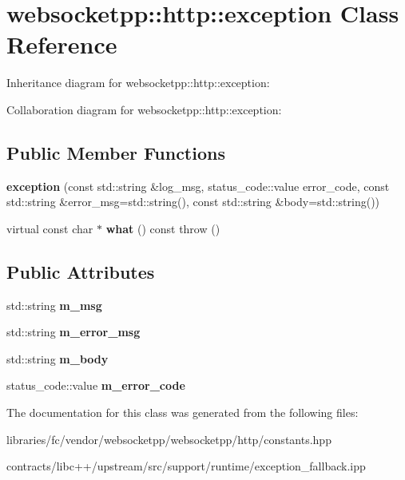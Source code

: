 \hypertarget{classwebsocketpp_1_1http_1_1exception}{}\section{websocketpp\+:\+:http\+:\+:exception Class Reference}
\label{classwebsocketpp_1_1http_1_1exception}


Inheritance diagram for websocketpp\+:\+:http\+:\+:exception\+:


Collaboration diagram for websocketpp\+:\+:http\+:\+:exception\+:
\subsection*{Public Member Functions}
\begin{DoxyCompactItemize}
\item 
\mbox{\label{classwebsocketpp_1_1http_1_1exception_a693f5feba657716d2bd20673951b5d28}} 
{\bfseries exception} (const std\+::string \&log\+\_\+msg, status\+\_\+code\+::value error\+\_\+code, const std\+::string \&error\+\_\+msg=std\+::string(), const std\+::string \&body=std\+::string())
\item 
\mbox{\label{classwebsocketpp_1_1http_1_1exception_a4c8f18cdab49c346f71bc1fdb1e3f3d2}} 
virtual const char $\ast$ {\bfseries what} () const  throw ()
\end{DoxyCompactItemize}
\subsection*{Public Attributes}
\begin{DoxyCompactItemize}
\item 
\mbox{\label{classwebsocketpp_1_1http_1_1exception_a2be9d8a05bad1b10432fdf4e25159dfe}} 
std\+::string {\bfseries m\+\_\+msg}
\item 
\mbox{\label{classwebsocketpp_1_1http_1_1exception_ab723cf4d6e80075e9a73da3b7577cdc3}} 
std\+::string {\bfseries m\+\_\+error\+\_\+msg}
\item 
\mbox{\label{classwebsocketpp_1_1http_1_1exception_ac8a456ed1db5ead45831fdc61b216958}} 
std\+::string {\bfseries m\+\_\+body}
\item 
\mbox{\label{classwebsocketpp_1_1http_1_1exception_a169eaa70f405f073091194113fe75d0c}} 
status\+\_\+code\+::value {\bfseries m\+\_\+error\+\_\+code}
\end{DoxyCompactItemize}


The documentation for this class was generated from the following files\+:\begin{DoxyCompactItemize}
\item 
libraries/fc/vendor/websocketpp/websocketpp/http/constants.\+hpp\item 
contracts/libc++/upstream/src/support/runtime/exception\+\_\+fallback.\+ipp\end{DoxyCompactItemize}
